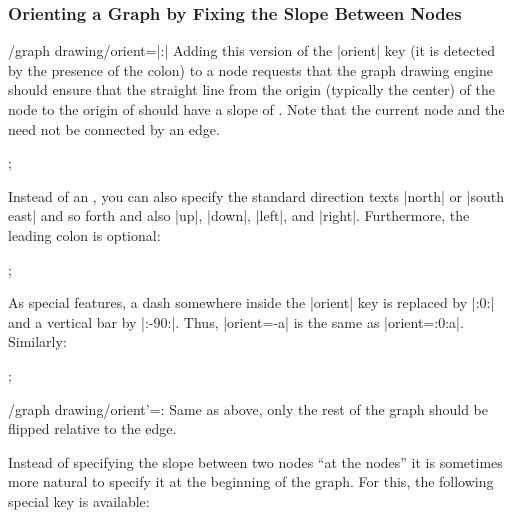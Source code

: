 \subsubsection{Orienting a Graph by Fixing the Slope Between Nodes}

\begin{key}{/graph drawing/orient=\opt{|:|}|:|}
  Adding this version of the |orient| key (it is detected by the
  presence of the colon) to a node requests that the graph drawing
  engine should ensure that the straight line from the origin (typically
  the center) of the node to the origin of 
  should have a slope of . Note that the current node
  and the  need not be connected by an edge.
\begin{codeexample}[]
\tikz {};
\end{codeexample}
  
  Instead of an , you can also specify the standard
  direction texts |north| or |south east| and so forth and also
  |up|, |down|, |left|, and |right|. Furthermore, the leading colon is
  optional: 
\begin{codeexample}[]
\tikz {};
\end{codeexample}

  As special features, a dash somewhere inside the |orient| key is
  replaced by |:0:| and a vertical bar by |:-90:|. Thus, |orient=-a|
  is the same as |orient=:0:a|. Similarly:
\begin{codeexample}[]
\tikz {};
\end{codeexample}
\end{key}

\begin{key}{/graph drawing/orient'=:}
  Same as above, only the rest of the graph should be flipped relative
  to the edge.
\end{key}

Instead of specifying the slope between two nodes ``at the nodes'' it 
is sometimes more natural to specify it at the beginning of the
graph. For this, the following special key is available:

